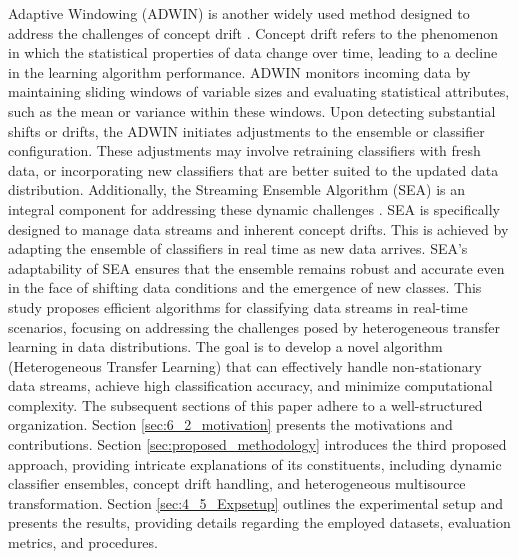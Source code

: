 Adaptive Windowing (ADWIN) is another widely used method designed to address the challenges of concept drift \cite{madkour2023historical}. Concept drift refers to the phenomenon in which the statistical properties of data change over time, leading to a decline in the learning algorithm performance. ADWIN monitors incoming data by maintaining sliding windows of variable sizes and evaluating statistical attributes, such as the mean or variance within these windows. Upon detecting substantial shifts or drifts, the ADWIN initiates adjustments to the ensemble or classifier configuration. These adjustments may involve retraining classifiers with fresh data, or incorporating new classifiers that are better suited to the updated data distribution. Additionally, the Streaming Ensemble Algorithm (SEA) is an integral component for addressing these dynamic challenges \cite{gama2004learning, adams2023explainable, madkour2023historical}. SEA is specifically designed to manage data streams and inherent concept drifts. This is achieved by adapting the ensemble of classifiers in real time as new data arrives. SEA's adaptability of SEA ensures that the ensemble remains robust and accurate even in the face of shifting data conditions and the emergence of new classes.
This study proposes efficient algorithms for classifying data streams in real-time scenarios, focusing on addressing the challenges posed by heterogeneous transfer learning in data distributions. The goal is to develop a novel algorithm (Heterogeneous Transfer Learning) that can effectively handle non-stationary data streams, achieve high classification accuracy, and minimize computational complexity. 
The subsequent sections of this paper adhere to a well-structured organization. Section \ref{sec:6_2_motivation} presents the motivations and contributions. Section \ref{sec:proposed_methodology} introduces the third proposed approach, providing intricate explanations of its constituents, including dynamic classifier ensembles, concept drift handling, and heterogeneous multisource transformation. Section \ref{sec:4_5_Expsetup} outlines the experimental setup and presents the results, providing details regarding the employed datasets, evaluation metrics, and procedures.

